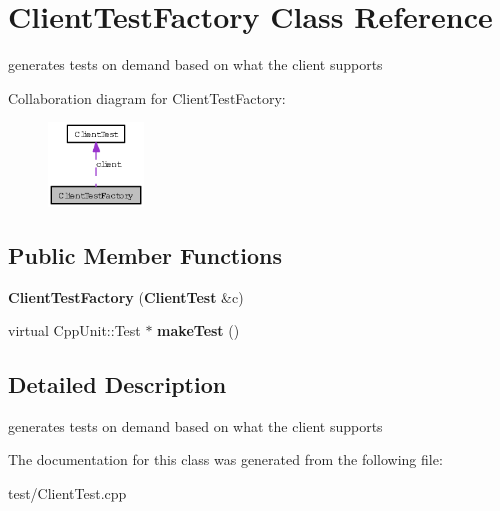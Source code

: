 \section{Client\-Test\-Factory Class Reference}
\label{classClientTestFactory}
generates tests on demand based on what the client supports  


Collaboration diagram for Client\-Test\-Factory:\begin{figure}[H]
\begin{center}
\leavevmode
\includegraphics[width=72pt]{classClientTestFactory__coll__graph}
\end{center}
\end{figure}
\subsection*{Public Member Functions}
\begin{CompactItemize}
\item 
\textbf{Client\-Test\-Factory} ({\bf Client\-Test} \&c)\label{classClientTestFactory_d7fc04c3d8da3a17c21eeed2b12669dd}

\item 
virtual Cpp\-Unit::Test $\ast$ \textbf{make\-Test} ()\label{classClientTestFactory_79b47afa6a315d031971d7ab3f8dcd39}

\end{CompactItemize}


\subsection{Detailed Description}
generates tests on demand based on what the client supports 



The documentation for this class was generated from the following file:\begin{CompactItemize}
\item 
test/Client\-Test.cpp\end{CompactItemize}
